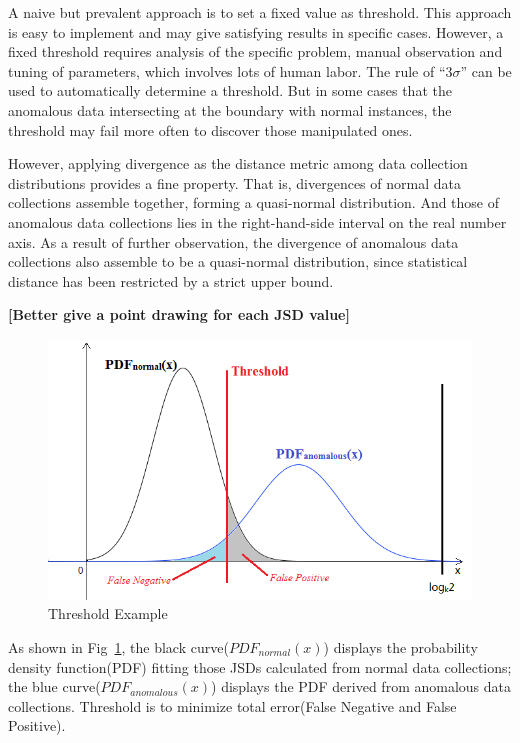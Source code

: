 \documentclass[a4paper]{IEEEtran}
\begin{document}
			A naive but prevalent approach is to set a fixed value as threshold. This approach is easy to implement and may give satisfying results in specific cases. However, a fixed threshold requires analysis of the specific problem, manual observation and tuning of parameters, which involves lots of human labor. The rule of ``$3 \sigma$'' can be used to automatically determine a threshold. But in some cases that the anomalous data intersecting at the boundary with normal instances, the threshold may fail more often to discover those manipulated ones.
			
			However, applying divergence as the distance metric among data collection distributions provides a fine property. That is, divergences of normal data collections assemble together, forming a quasi-normal distribution. And those of anomalous data collections lies in the right-hand-side interval on the real number axis. As a result of further observation, the divergence of anomalous data collections also assemble to be a quasi-normal distribution, since statistical distance has been restricted by a strict upper bound.
			
			\textbf{[Better give a point drawing for each JSD value]}
			
			\begin{figure}[!ht]
				\centering
				\includegraphics[width=\linewidth]{fig/ExampleThreshold.png}
				\caption{Threshold Example}
				\label{fig:example-threshold}
			\end{figure}
			
			As shown in Fig~\ref{fig:example-threshold}, the black curve($PDF_{normal}(x)$) displays the probability density function(PDF) fitting those JSDs calculated from normal data collections; the blue curve($PDF_{anomalous}(x)$) displays the PDF derived from anomalous data collections. Threshold is to minimize total error(False Negative and False Positive).
			
\end{document}
